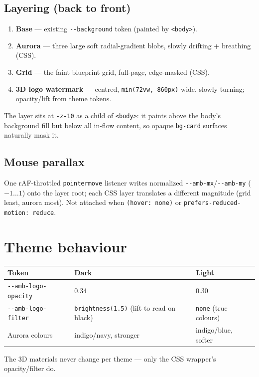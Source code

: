 \documentclass[11pt,a4paper]{article}
\begin{document}
\subsection{Layering (back to front)}
\begin{enumerate}
  \item \textbf{Base} --- existing \texttt{-{}-background} token (painted by \texttt{<body>}).
  \item \textbf{Aurora} --- three large soft radial-gradient blobs, slowly drifting + breathing (CSS).
  \item \textbf{Grid} --- the faint blueprint grid, full-page, edge-masked (CSS).
  \item \textbf{3D logo watermark} --- centred, \texttt{min(72vw, 860px)} wide, slowly turning;
        opacity/lift from theme tokens.
\end{enumerate}

The layer sits at \texttt{-z-10} as a child of \texttt{<body>}: it paints above the body's
background fill but below all in-flow content, so opaque \texttt{bg-card} surfaces naturally
mask it.

\subsection{Mouse parallax}
One rAF-throttled \texttt{pointermove} listener writes normalized
\texttt{-{}-amb-mx}/\texttt{-{}-amb-my} ($-1\ldots1$) onto the layer root; each CSS layer
translates a different magnitude (grid least, aurora most). Not attached when
\texttt{(hover: none)} or \texttt{prefers-reduced-motion: reduce}.

\section{Theme behaviour}
\begin{center}
\begin{tabularx}{\textwidth}{l Y Y}
\toprule
\textbf{Token} & \textbf{Dark} & \textbf{Light}\\
\midrule
\texttt{-{}-amb-logo-opacity} & 0.34 & 0.30\\
\texttt{-{}-amb-logo-filter} & \texttt{brightness(1.5)} (lift to read on black) &
\texttt{none} (true colours)\\
Aurora colours & indigo/navy, stronger & indigo/blue, softer\\
\bottomrule
\end{tabularx}
\end{center}
The 3D materials never change per theme --- only the CSS wrapper's opacity/filter do.
\end{document}
